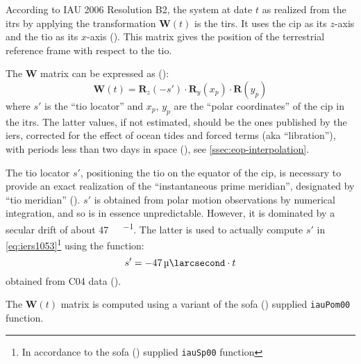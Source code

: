 According to IAU 2006 Resolution B2, the system at date $t$ as realized 
from the \gls{itrs} by applying the transformation $\bm{W}(t)$ is the 
\gls{tirs}. It uses the \gls{cip} as its $z$-axis and the \gls{tio} as 
its $x$-axis (\cite{iers2010}). This matrix gives the position of the 
terrestrial reference frame with respect to the \gls{tio}.

The $\bm{W}$ matrix can be expressed as (\cite{iers2010}):
\begin{equation}
    \bm{W}(t) = \bm{R}_z(-s') \cdot \bm{R}_y(x_p) \cdot \bm{R}(y_p)
    \label{eq:iers1053}
\end{equation}
where $s'$ is the ``\gls{tio} locator'' and $x_p$, $y_p$ are the 
``polar coordinates'' of the \gls{cip} in the \gls{itrs}. The latter values, 
if not estimated, should be the ones published by the \gls{iers}, corrected for 
the effect of ocean tides and forced terms (aka ``libration''), with periods 
less than two days in space (\cite{iers2010}), see \ref{ssec:eop-interpolation}.

The \gls{tio} locator $s'$, positioning the \gls{tio} on the equator of the \gls{cip}, 
is necessary to provide an exact realization of the ``instantaneous prime meridian'', 
designated by ``\gls{tio} meridian'' (\cite{iers2010}). $s'$ is obtained from 
polar motion observations by numerical integration, and so is in essence 
unpredictable. However, it is dominated by a secular drift of about 
\SI{47}{\micro\larcsecond\per\century}. The latter is used to actually compute 
$s'$ in \ref{eq:iers1053}\footnote{In accordance to the \gls{sofa} (\cite{SOFA20210125}) supplied \texttt{iauSp00} function} 
using the function:
\begin{equation}
  s' = \SI{-47}{\micro\larcsecond} \cdot t
  \label{eq:iers10513}
\end{equation}
obtained from C04 data (\cite{Lambert2002}).

The $\bm{W}(t)$ matrix is computed using a variant of the \gls{sofa} (\cite{SOFA20210125}) 
supplied \texttt{iauPom00} function.

